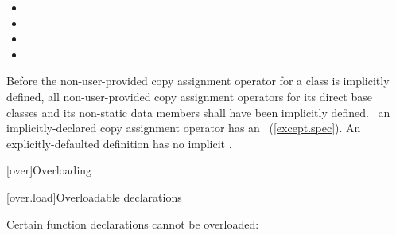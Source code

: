 \documentclass[american]{book}
\begin{document}
\begin{itemize}
\item
{}
\item
{}
\item
{}
\item
{}
\end{itemize}

Before the non-user-provided copy assignment operator for a class is
implicitly defined,
all non-user-provided copy assignment operators for
its direct base classes and
its non-static data members shall have been implicitly defined.
\enternote\ 
an implicitly-declared copy assignment operator has an
~(\ref{except.spec}).
An explicitly-defaulted 
definition has no implicit .
\exitnote\ 

\setcounter{chapter}{12}
[over]{Overloading}

[over.load]{Overloadable declarations}
\setcounter{Paras}{1}

\pnum
Certain function declarations cannot be overloaded:
\end{document}
